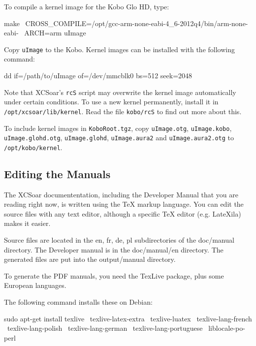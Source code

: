 To compile a kernel image for the Kobo Glo HD, type:

\begin{verbatim*}
make \
  CROSS_COMPILE=/opt/gcc-arm-none-eabi-4_6-2012q4/bin/arm-none-eabi- \
  ARCH=arm uImage
\end{verbatim*}

Copy \texttt{uImage} to the Kobo.  Kernel images can be installed with
the following command:

\begin{verbatim*}
dd if=/path/to/uImage of=/dev/mmcblk0 bs=512 seek=2048
\end{verbatim*}

Note that XCSoar's \texttt{rcS} script may overwrite the kernel image
automatically under certain conditions.  To use a new kernel
permanently, install it in \texttt{/opt/xcsoar/lib/kernel}.  Read the
file \texttt{kobo/rcS} to find out more about this.

To include kernel images in \texttt{KoboRoot.tgz}, copy
\texttt{uImage.otg}, \texttt{uImage.kobo}, \texttt{uImage.glohd.otg},
\texttt{uImage.glohd}, \texttt{uImage.aura2} and \texttt{uImage.aura2.otg} to
\texttt{/opt/kobo/kernel}.

\subsection{Editing the Manuals}

The XCSoar documententation, including the Developer Manual that you are 
reading right now, is written using the TeX markup language. You can edit
the source files with any text editor, although a specific TeX editor (e.g. LateXila) 
makes it easier. 

Source files are located in the en, fr, de, pl subdirectories of the doc/manual directory. 
The Developer manual is in the doc/manual/en directory. The generated files are put into
the output/manual directory.

To generate the PDF manuals, you need the TexLive package, plus some European languages.

The following command installs these on Debian:

\begin{verbatim*}
sudo apt-get install texlive \
  texlive-latex-extra \
  texlive-luatex \
  texlive-lang-french \
  texlive-lang-polish \
  texlive-lang-german \
  texlive-lang-portuguese \
  liblocale-po-perl
\end{verbatim*}

